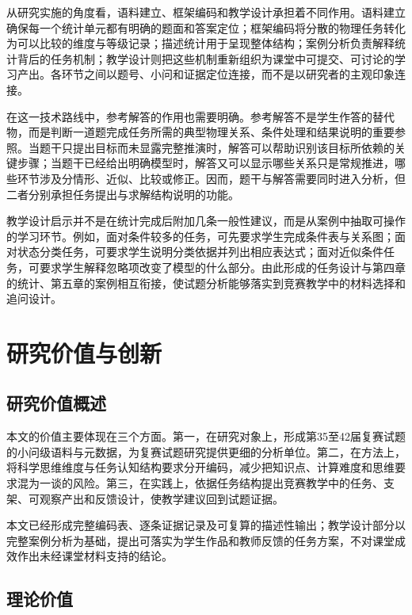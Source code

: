 \documentclass[
  12pt,
  a4paper,twoside,openany]{ctexbook}
\begin{document}
从研究实施的角度看，语料建立、框架编码和教学设计承担着不同作用。语料建立确保每一个统计单元都有明确的题面和答案定位；框架编码将分散的物理任务转化为可以比较的维度与等级记录；描述统计用于呈现整体结构；案例分析负责解释统计背后的任务机制；教学设计则把这些机制重新组织为课堂中可提交、可讨论的学习产出。各环节之间以题号、小问和证据定位连接，而不是以研究者的主观印象连接。

在这一技术路线中，参考解答的作用也需要明确。参考解答不是学生作答的替代物，而是判断一道题完成任务所需的典型物理关系、条件处理和结果说明的重要参照。当题干只提出目标而未显露完整推演时，解答可以帮助识别该目标所依赖的关键步骤；当题干已经给出明确模型时，解答又可以显示哪些关系只是常规推进，哪些环节涉及分情形、近似、比较或修正。因而，题干与解答需要同时进入分析，但二者分别承担任务提出与求解结构说明的功能。

教学设计启示并不是在统计完成后附加几条一般性建议，而是从案例中抽取可操作的学习环节。例如，面对条件较多的任务，可先要求学生完成条件表与关系图；面对状态分类任务，可要求学生说明分类依据并列出相应表达式；面对近似条件任务，可要求学生解释忽略项改变了模型的什么部分。由此形成的任务设计与第四章的统计、第五章的案例相互衔接，使试题分析能够落实到竞赛教学中的材料选择和追问设计。

\section{研究价值与创新}\label{ux7814ux7a76ux4ef7ux503cux4e0eux521bux65b0}

\subsection{研究价值概述}\label{ux7814ux7a76ux4ef7ux503cux6982ux8ff0}

本文的价值主要体现在三个方面。第一，在研究对象上，形成第35至42届复赛试题的小问级语料与元数据，为复赛试题研究提供更细的分析单位。第二，在方法上，将科学思维维度与任务认知结构要求分开编码，减少把知识点、计算难度和思维要求混为一谈的风险。第三，在实践上，依据任务结构提出竞赛教学中的任务、支架、可观察产出和反馈设计，使教学建议回到试题证据。

本文已经形成完整编码表、逐条证据记录及可复算的描述性输出；教学设计部分以完整案例分析为基础，提出可落实为学生作品和教师反馈的任务方案，不对课堂成效作出未经课堂材料支持的结论。

\subsection{理论价值}\label{ux7406ux8bbaux4ef7ux503c}
\end{document}
